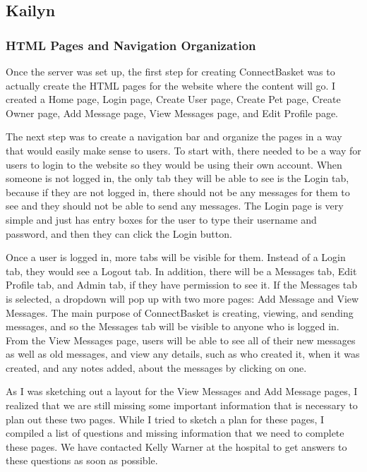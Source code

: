 \documentclass[onecolumn, draftclsnofoot,10pt, compsoc]{IEEEtran}
\begin{document}
\subsection{Kailyn}

\subsubsection{HTML Pages and Navigation Organization}
Once the server was set up, the first step for creating ConnectBasket was to actually create the HTML pages for the website where the content will go. I created a Home page, Login page, Create User page, Create Pet page, Create Owner page, Add Message page, View Messages page, and Edit Profile page. 

The next step was to create a navigation bar and organize the pages in a way that would easily make sense to users. To start with, there needed to be a way for users to login to the website so they would be using their own account. When someone is not logged in, the only tab they will be able to see is the Login tab, because if they are not logged in, there should not be any messages for them to see and they should not be able to send any messages. The Login page is very simple and just has entry boxes for the user to type their username and password, and then they can click the Login button. 

Once a user is logged in, more tabs will be visible for them. Instead of a Login tab, they would see a Logout tab. In addition, there will be a Messages tab, Edit Profile tab, and Admin tab, if they have permission to see it. If the Messages tab is selected, a dropdown will pop up with two more pages: Add Message and View Messages. The main purpose of ConnectBasket is creating, viewing, and sending messages, and so the Messages tab will be visible to anyone who is logged in. From the View Messages page, users will be able to see all of their new messages as well as old messages, and view any details, such as who created it, when it was created, and any notes added, about the messages by clicking on one. 

As I was sketching out a layout for the View Messages and Add Message pages, I realized that we are still missing some important information that is necessary to plan out these two pages. While I tried to sketch a plan for these pages, I compiled a list of questions and missing information that we need to complete these pages. We have contacted Kelly Warner at the hospital to get answers to these questions as soon as possible.  
\end{document}
